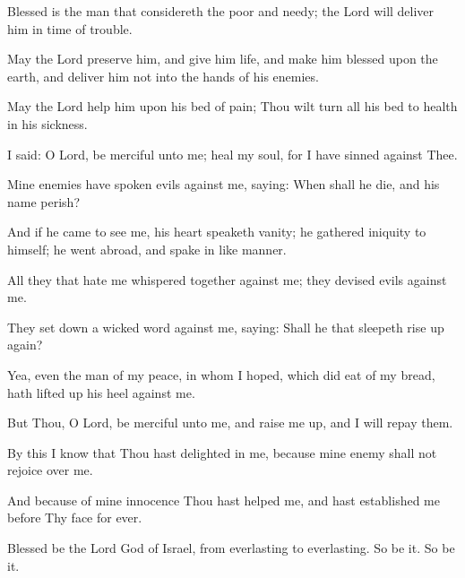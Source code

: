 Blessed is the man that considereth the poor and needy; the Lord will deliver him in time of trouble.

May the Lord preserve him, and give him life, and make him blessed upon the earth, and deliver him not into the hands of his enemies.

May the Lord help him upon his bed of pain; Thou wilt turn all his bed to health in his sickness.

I said: O Lord, be merciful unto me; heal my soul, for I have sinned against Thee.

Mine enemies have spoken evils against me, saying: When shall he die, and his name perish?

And if he came to see me, his heart speaketh vanity; he gathered iniquity to himself; he went abroad, and spake in like manner.

All they that hate me whispered together against me; they devised evils against me.

They set down a wicked word against me, saying: Shall he that sleepeth rise up again?

Yea, even the man of my peace, in whom I hoped, which did eat of my bread, hath lifted up his heel against me.

But Thou, O Lord, be merciful unto me, and raise me up, and I will repay them.

By this I know that Thou hast delighted in me, because mine enemy shall not rejoice over me.

And because of mine innocence Thou hast helped me, and hast established me before Thy face for ever.

Blessed be the Lord God of Israel, from everlasting to everlasting. So be it. So be it.

